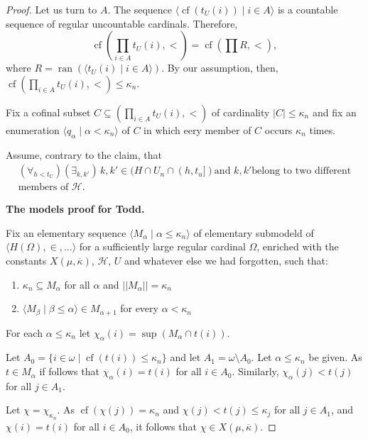 \documentclass{amsart}
\theoremstyle{remark}
\DeclareMathOperator{\cf}{cf}
\DeclareMathOperator{\ran}{ran}
\renewcommand\mid{\mathrel{|}\allowbreak}
\begin{document}
\begin{proof}
  Let us turn to \(A\). The sequence \(\langle \cf(t_{U}(i))\mid i\in A\rangle\) is a countable sequence of regular uncountable cardinals. Therefore,
  \[\cf(\prod_{i\in A}t_U(i),<)=\cf(\prod R,<),\]
  where \(R=\ran(\langle t_{U}(i)\mid i\in A\rangle)\). By our assumption, then,
 \(\cf(\prod_{i\in A}t_{U}(i),<)\le\kappa_{n}\).

 Fix a cofinal
subset \(C\subseteq (\prod_{i\in A}t_{U}(i),<)\) of cardinality 
\(|C|\le \kappa_n\) and fix an enumeration
\(\langle q_\alpha\mid\alpha<\kappa_n\rangle\) of \(C\) 
in which eery member of $C$
occurs $\kappa_n$ times. 


Assume, contrary to the claim, that
\begin{multline}(\forall_{h<t_{U}})(\exists_{k,k'})\,k,k'\in (H\cap U_{n}\cap (h,t_{u}])
  \text{
    and }
  k,k' \text{
    belong to two different}\\
  \text{members of } \mathcal H.\label{negn}\tag{\(**\)}
  \end{multline}

\textbf{The models proof for Todd.}

Fix an elementary  sequence $\langle M_\alpha\mid \alpha\le \kappa_n\rangle$
 of elementary submodeld of $\langle H(\Omega),\in,\dots\rangle$ for a sufficiently large regular 
 cardinal $\Omega$, enriched with the constants 
 $X(\mu,\overline \kappa)$, $\mathcal H$, $U$ and whatever
 else we had forgotten, such that: 

 \begin{enumerate}
\item $\kappa_n\subseteq M_\alpha$ for all $\alpha$ and $||M_\alpha||=\kappa_n$
\item $\langle M_\beta\mid \beta\le \alpha\rangle\in M_{\alpha+1}$ for every $\alpha<\kappa_n$
 \end{enumerate}

For each $\alpha\le \kappa_n$ let $\chi_\alpha(i)=\sup(M_\alpha\cap t(i))$. 

Let $A_0=\{i\in \omega\mid \cf(t(i))\le \kappa_n\}$ and let $A_1=\omega\setminus A_0$. 
Let $\alpha\le\kappa_n$ be given. As $t\in M_\alpha$  if follows that $\chi_\alpha(i)=t(i)$ for all $i\in A_0$. Similarly, $\chi_\alpha(j)<t(j)$ for all $j\in A_1$. 

Let $\chi=\chi_{\kappa_n}$. As $\cf(\chi(j))=\kappa_n$ and $\chi(j)<t(j)\le \kappa_j$ for all $j\in A_1$, and $\chi(i)=t(i)$ for all $i\in A_0$, it follows that $\chi\in X(\mu,\overline \kappa)$.


\end{proof}
\end{document}
